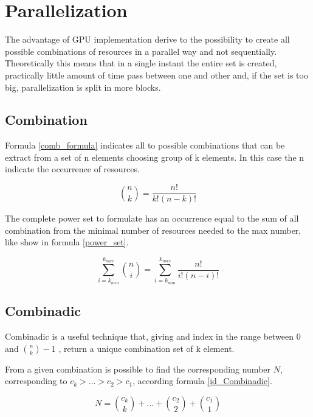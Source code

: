 \chapter{Parallelization}
\label{chap2}

The advantage of GPU implementation derive to the possibility to create all possible combinations of resources in a parallel way and not sequentially. Theoretically this means that in a single instant the entire set is created, practically little amount of time pass between one and other and, if the set is too big, parallelization is split in more blocks.

\section{Combination}

Formula \ref{comb_formula} indicates all to possible combinations that can be extract from a set of n elements choosing group of k elements. In this case the n indicate the occurrence of resources. 

\begin{equation}
    \binom{n}{k} = \frac{n!}{k!(n-k)!}
    \label{comb_formula}
\end{equation}

The complete power set to formulate has an occurrence equal to the sum of all combination from the minimal number of resources needed to the max number, like show in formula \ref{power_set}.

\begin{equation}
    \sum_{i=k_{min}}^{k_{max}} \binom{n}{i} = 
    \sum_{i=k_{min}}^{k_{max}} \frac{n!}{i!(n-i)!}
    \label{power_set}
\end{equation}

\section{Combinadic}
\label{Combinadic}

Combinadic is a useful technique that, giving and index in the range between 0 and $\binom{n}{k}-1$ , return a unique combination set of k element.

From a given combination is possible to find the corresponding number $N$, corresponding to 
$c_k > ... > c_2 > c_1$, according formula \ref{id_Combinadic}.
 
\begin{equation}
    N = \binom{c_k}{k} + ... + \binom{c_2}{2} + \binom{c_1}{1}
    \label{id_Combinadic}
\end{equation}

